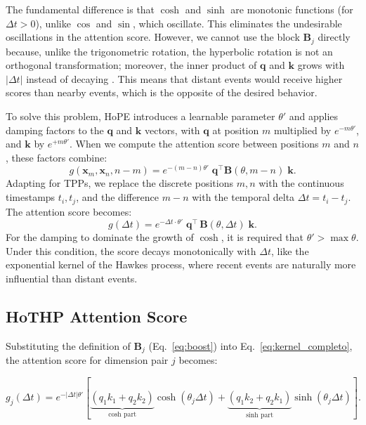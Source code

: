 \documentclass[runningheads]{llncs}
\begin{document}
The fundamental difference is that $\cosh$ and $\sinh$ are monotonic functions (for $\Delta t > 0$), unlike $\cos$ and $\sin$, which oscillate. This eliminates the undesirable oscillations in the attention score. However, we cannot use the block $\bm{B}_j$ directly because, unlike the trigonometric rotation, the hyperbolic rotation is not an orthogonal transformation; moreover, the inner product of $\bm{q}$ and $\bm{k}$ grows with $|\Delta t|$ instead of decaying \cite{dai2025hope}. This means that distant events would receive higher scores than nearby events, which is the opposite of the desired behavior.

To solve this problem, HoPE \cite{dai2025hope} introduces a learnable parameter $\theta'$ and applies damping factors to the $\bm{q}$ and $\bm{k}$ vectors, with $\bm{q}$ at position $m$ multiplied by $e^{-m\theta'}$, and $\bm{k}$ by $e^{+m\theta'}$. When we compute the attention score between positions $m$ and $n$, these factors combine:
%
\begin{equation}
g(\bm{x}_m, \bm{x}_n, n{-}m) = e^{-(m-n)\theta'} \; \bm{q}^\top \bm{B}(\theta, m{-}n) \; \bm{k}.
\label{eq:hope_score}
\end{equation}
%
Adapting for TPPs, we replace the discrete positions $m, n$ with the continuous timestamps $t_i, t_j$, and the difference $m - n$ with the temporal delta $\Delta t = t_i - t_j$. The attention score becomes:
%
\begin{equation}
g(\Delta t) = e^{-\Delta t \cdot \theta'} \; \bm{q}^\top \, \bm{B}(\theta ,\Delta t) \; \bm{k}.
\label{eq:kernel_completo}
\end{equation}
%
For the damping to dominate the growth of $\cosh$, it is required that $\theta' > \max \theta$. Under this condition, the score decays monotonically with $\Delta t$, like the exponential kernel of the Hawkes process, where recent events are naturally more influential than distant events.


\subsection{HoTHP Attention Score}

Substituting the definition of $\bm{B}_j$ (Eq.~\ref{eq:boost}) into Eq.~\ref{eq:kernel_completo}, the attention score for dimension pair $j$ becomes:

%
\begin{equation}                                                        g_j(\Delta t) = e^{-|\Delta t|\theta'}
\!\left[
\underbrace{(q_1 k_1 + q_2 k_2)}_{\text{cosh part}} \cosh(\theta_j \Delta t)
+ \underbrace{(q_1 k_2 + q_2 k_1)}_{\text{sinh part}} \sinh(\theta_j \Delta t)                                                                      
\right].                                                                    \label{eq:score_par}
\end{equation}
%      
\end{document}
